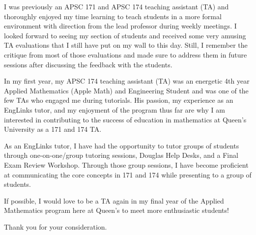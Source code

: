\documentclass[
  12pt,
  letterpaper,
  draft,
]{awesome-cv}
\begin{document}
  \begin{cvletter}
    I was previously an APSC 171 and APSC 174 teaching assistant (TA) and thoroughly enjoyed my time learning to teach students in a more formal environment with direction from the lead professor during weekly meetings. I looked forward to seeing my section of students and received some very amusing TA evaluations that I still have put on my wall to this day. Still, I remember the critique from most of those evaluations and made sure to address them in future sessions after discussing the feedback with the students.

    In my first year, my APSC 174 teaching assistant (TA) was an energetic 4th year Applied Mathematics (Apple Math) and Engineering Student and was one of the few TAs who engaged me during tutorials. His passion, my experience as an EngLinks tutor, and my enjoyment of the program thus far are why I am interested in contributing to the success of education in mathematics at Queen's University as a 171 and 174 TA.

    As an EngLinks tutor, I have had the opportunity to tutor groups of students through one-on-one/group tutoring sessions, Douglas Help Desks, and a Final Exam Review Workshop. Through those group sessions, I have become proficient at communicating the core concepts in 171 and 174 while presenting to a group of students.

    If possible, I would love to be a TA again in my final year of the Applied Mathematics program here at Queen's to meet more enthusiastic students!

    Thank you for your consideration.
  \end{cvletter}

  \makeletterclosing{}
\end{document}
